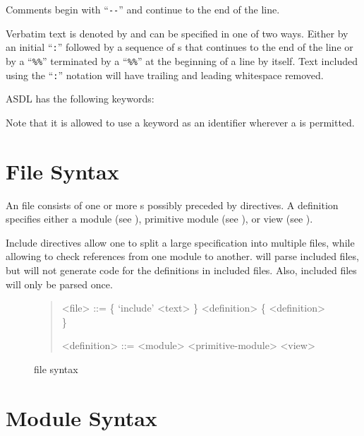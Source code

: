 Comments begin with ``\lstinline[language=ASDL]!--!''
and continue to the end of the line.

Verbatim text is denoted by  and can be specified in one of two ways.
Either by an initial ``\lstinline!:!'' followed by a sequence of s that
continues to the end of the line or by a ``\lstinline!%%!'' terminated by a ``\lstinline!%%!''
at the beginning of a line by itself. 
Text included using the ``\lstinline!:!'' notation will have trailing and leading 
whitespace removed.

ASDL has the following keywords:
\begin{quote}
     
     
\end{quote}%
Note that it is allowed to use a keyword as an identifier wherever a  is permitted.

\section{File Syntax}

An \asdl{} file consists of one or more s possibly preceded by 
directives.
A definition specifies either a module (see ),
primitive module (see ),
or view (see ).

Include directives allow one to split a large \asdl{} specification into multiple files,
while allowing \asdlgen{} to check references from one module to another.
\asdlgen{} will parse included files, but will not generate code for the definitions in included
files.
Also, included files will only be parsed once.

\begin{figure}[t]
  \begin{quote}
    \begin{grammar}
      <file>  ::=  \{ `include' <text> \} <definition> \{ <definition> \}
      
      <definition> ::= <module>
        \alt{} <primitive-module>
        \alt{} <view>
    \end{grammar}
  \end{quote}
  \caption{\asdl{} file syntax}
  \label{fig:file-syntax}
\end{figure}%

\section{Module Syntax}
\label{sec:module-syntax}

